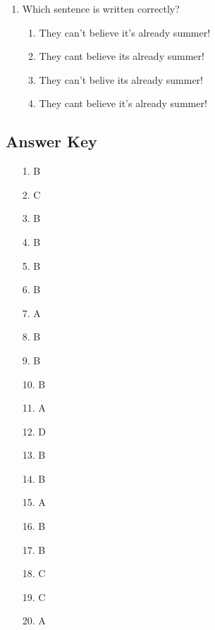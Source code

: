 \documentclass[12pt]{article}
\begin{document}
\begin{enumerate}
    \vspace{0.5cm}

    \item Which sentence is written correctly?

    \begin{enumerate}[label=\Alph*.]
        \item They can’t believe it’s already summer!
        \item They cant believe its already summer!
        \item They can’t belive its already summer!
        \item They cant believe it’s already summer!
    \end{enumerate}

\end{enumerate}

\newpage
\subsection*{Answer Key}

\begin{enumerate}

    \item[1.] B
    \item[2.] C
    \item[3.] B
    \item[4.] B
    \item[5.] B
    \item[6.] B
    \item[7.] A
    \item[8.] B
    \item[9.] B
    \item[10.] B
    \item[11.] A
    \item[12.] D
    \item[13.] B
    \item[14.] B
    \item[15.] A
    \item[16.] B
    \item[17.] B
    \item[18.] C
    \item[19.] C
    \item[20.] A

\end{enumerate}
\end{document}
